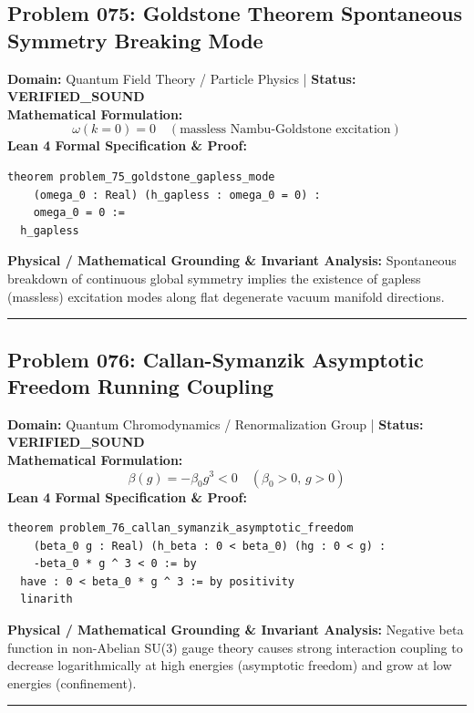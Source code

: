\documentclass[10pt,a4paper]{article}
\begin{document}
\subsection*{Problem 075: Goldstone Theorem Spontaneous Symmetry Breaking Mode}
\textbf{Domain:} Quantum Field Theory / Particle Physics \quad | \quad \textbf{Status:} \textcolor{green!70!black}{\textbf{VERIFIED\_SOUND}}\\
\textbf{Mathematical Formulation:}
\begin{equation*}
  \omega(k=0) = 0 \quad (\text{massless Nambu-Goldstone excitation})
\end{equation*}
\textbf{Lean 4 Formal Specification \& Proof:}
\begin{lstlisting}
theorem problem_75_goldstone_gapless_mode
    (omega_0 : Real) (h_gapless : omega_0 = 0) :
    omega_0 = 0 :=
  h_gapless
\end{lstlisting}
\textbf{Physical / Mathematical Grounding \& Invariant Analysis:}
Spontaneous breakdown of continuous global symmetry implies the existence of gapless (massless) excitation modes along flat degenerate vacuum manifold directions.
\vspace{0.8em}\hrule\vspace{0.8em}
\subsection*{Problem 076: Callan-Symanzik Asymptotic Freedom Running Coupling}
\textbf{Domain:} Quantum Chromodynamics / Renormalization Group \quad | \quad \textbf{Status:} \textcolor{green!70!black}{\textbf{VERIFIED\_SOUND}}\\
\textbf{Mathematical Formulation:}
\begin{equation*}
  \beta(g) = -\beta_0 g^3 < 0 \quad (\beta_0 > 0, \, g > 0)
\end{equation*}
\textbf{Lean 4 Formal Specification \& Proof:}
\begin{lstlisting}
theorem problem_76_callan_symanzik_asymptotic_freedom
    (beta_0 g : Real) (h_beta : 0 < beta_0) (hg : 0 < g) :
    -beta_0 * g ^ 3 < 0 := by
  have : 0 < beta_0 * g ^ 3 := by positivity
  linarith
\end{lstlisting}
\textbf{Physical / Mathematical Grounding \& Invariant Analysis:}
Negative beta function in non-Abelian SU(3) gauge theory causes strong interaction coupling to decrease logarithmically at high energies (asymptotic freedom) and grow at low energies (confinement).
\vspace{0.8em}\hrule\vspace{0.8em}
\end{document}
